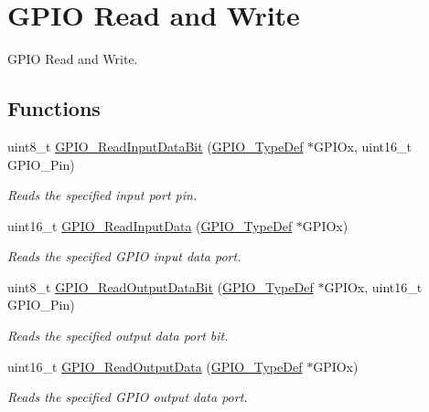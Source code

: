 \hypertarget{group___g_p_i_o___group2}{}\section{G\+P\+IO Read and Write}
\label{group___g_p_i_o___group2}


G\+P\+IO Read and Write.  


\subsection*{Functions}
\begin{DoxyCompactItemize}
\item 
uint8\+\_\+t \hyperlink{group___g_p_i_o___group2_ga98772ef6b639b3fa06c8ae5ba28d3aaa}{G\+P\+I\+O\+\_\+\+Read\+Input\+Data\+Bit} (\hyperlink{struct_g_p_i_o___type_def}{G\+P\+I\+O\+\_\+\+Type\+Def} $\ast$G\+P\+I\+Ox, uint16\+\_\+t G\+P\+I\+O\+\_\+\+Pin)
\begin{DoxyCompactList}\small\item\em Reads the specified input port pin. \end{DoxyCompactList}\item 
uint16\+\_\+t \hyperlink{group___g_p_i_o___group2_ga139a33adc8409288e9f193bbebb5a0f7}{G\+P\+I\+O\+\_\+\+Read\+Input\+Data} (\hyperlink{struct_g_p_i_o___type_def}{G\+P\+I\+O\+\_\+\+Type\+Def} $\ast$G\+P\+I\+Ox)
\begin{DoxyCompactList}\small\item\em Reads the specified G\+P\+IO input data port. \end{DoxyCompactList}\item 
uint8\+\_\+t \hyperlink{group___g_p_i_o___group2_ga138270f8695b105b7c6ed405792919c1}{G\+P\+I\+O\+\_\+\+Read\+Output\+Data\+Bit} (\hyperlink{struct_g_p_i_o___type_def}{G\+P\+I\+O\+\_\+\+Type\+Def} $\ast$G\+P\+I\+Ox, uint16\+\_\+t G\+P\+I\+O\+\_\+\+Pin)
\begin{DoxyCompactList}\small\item\em Reads the specified output data port bit. \end{DoxyCompactList}\item 
uint16\+\_\+t \hyperlink{group___g_p_i_o___group2_gaf8938a34280b7dc3e39872a7c17bb323}{G\+P\+I\+O\+\_\+\+Read\+Output\+Data} (\hyperlink{struct_g_p_i_o___type_def}{G\+P\+I\+O\+\_\+\+Type\+Def} $\ast$G\+P\+I\+Ox)
\begin{DoxyCompactList}\small\item\em Reads the specified G\+P\+IO output data port. \end{DoxyCompactList}\item 

\end{DoxyCompactItemize}
